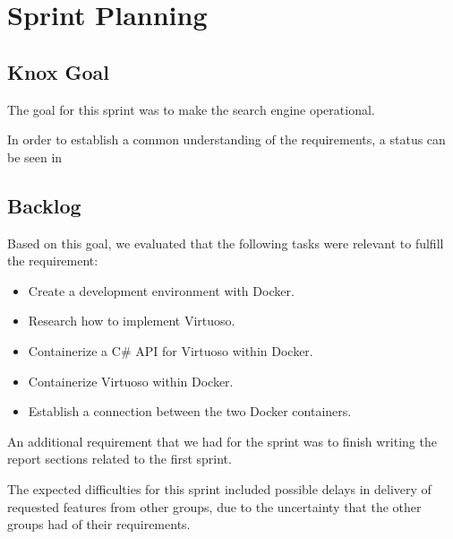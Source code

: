 \section{Sprint Planning}
\subsection*{Knox Goal}
The goal for this sprint was to make the search engine operational.

In order to establish a common understanding of the requirements, a status can be seen in \secref


\subsection*{Backlog}
Based on this goal, we evaluated that the following tasks were relevant to fulfill the requirement:
\begin{itemize}
    \item Create a development environment with Docker.
    \item Research how to implement Virtuoso.
    \item Containerize a C# API for Virtuoso within Docker.
    \item Containerize Virtuoso within Docker.
    \item Establish a connection between the two Docker containers.
\end{itemize}

An additional requirement that we had for the sprint was to finish writing the report sections related to the first \knox{} sprint.

The expected difficulties for this sprint included possible delays in delivery of requested features from other groups, due to the uncertainty that the other groups had of their requirements. 




